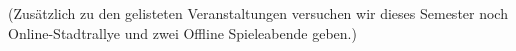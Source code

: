 \begin{description}
%
%

(Zusätzlich zu den gelisteten Veranstaltungen versuchen wir dieses Semester noch Online-Stadtrallye und zwei Offline Spieleabende geben.)

\end{description}
